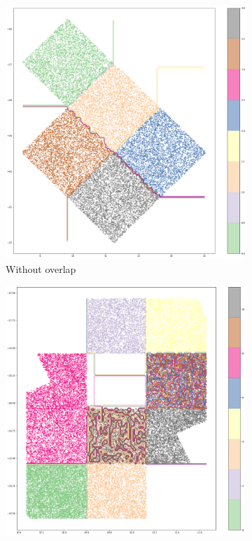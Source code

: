 \begin{figure}[htbp]
    \begin{subfigure}[]{0.5\textwidth}
    \includegraphics[width=\textwidth]{images/A2_prototypes/tu_multifile_tree.png}
    \caption{Without overlap}\label{subfig:tu_multifile}
    \end{subfigure}
    \hfill
    \begin{subfigure}[]{0.5\textwidth}
    \includegraphics[width=\textwidth]{images/A2_prototypes/mer_multifile_tree.png}

\end{subfigure}
\end{figure}
